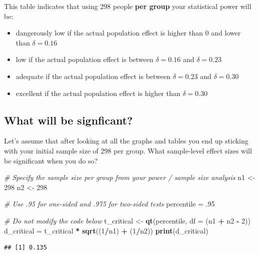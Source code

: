 \documentclass[
]{krantz}
\makeatletter
\newenvironment{Shaded}{\begin{snugshade}}{\end{snugshade}}
\newcommand{\CommentTok}[1]{\textcolor[rgb]{0.37,0.37,0.37}{\textit{#1}}}
\newcommand{\DataTypeTok}[1]{\textcolor[rgb]{0.27,0.27,0.27}{#1}}
\newcommand{\DecValTok}[1]{\textcolor[rgb]{0.06,0.06,0.06}{#1}}
\newcommand{\FloatTok}[1]{\textcolor[rgb]{0.06,0.06,0.06}{#1}}
\newcommand{\KeywordTok}[1]{\textcolor[rgb]{0.27,0.27,0.27}{\textbf{#1}}}
\newcommand{\NormalTok}[1]{#1}
\newcommand{\OperatorTok}[1]{\textcolor[rgb]{0.43,0.43,0.43}{\textbf{#1}}}
\newcommand{\StringTok}[1]{\textcolor[rgb]{0.5,0.5,0.5}{#1}}
\newenvironment{kframe}{%
\medskip{}
\setlength{\fboxsep}{.8em}
 \def\at@end@of@kframe{}%
 \ifinner\ifhmode%
  \def\at@end@of@kframe{\end{minipage}}%
  \begin{minipage}{\columnwidth}%
 \fi\fi%
 \def\FrameCommand##1{\hskip\@totalleftmargin \hskip-\fboxsep
 \colorbox{shadecolor}{##1}\hskip-\fboxsep
     \hskip-\linewidth \hskip-\@totalleftmargin \hskip\columnwidth}%
 \MakeFramed {\advance\hsize-\width
   \@totalleftmargin\z@ \linewidth\hsize
   \@setminipage}}%
 {\par\unskip\endMakeFramed%
 \at@end@of@kframe}
\renewenvironment{Shaded}{\begin{kframe}}{\end{kframe}}
\makeatother
\begin{document}
This table indicates that using 298 people \textbf{per group} your statistical power will be:

\begin{itemize}
\item
  dangerously low if the actual population effect is higher than 0 and lower than \(\delta = 0.16\)
\item
  low if the actual population effect is between \(\delta = 0.16\) and \(\delta = 0.23\)
\item
  adequate if the actual population effect is between \(\delta = 0.23\) and \(\delta = 0.30\)
\item
  excellent if the actual population effect is higher than \(\delta = 0.30\)
\end{itemize}

\hypertarget{what-will-be-signficant}{%
\subsection{What will be signficant?}\label{what-will-be-signficant}}

Let's assume that after looking at all the graphs and tables you end up sticking with your initial sample size of 298 per group. What sample-level effect sizes will be significant when you do so?

\begin{Shaded}
\begin{Highlighting}[]
\CommentTok{# Specify the sample size per group from your power / sample size analysis}
\NormalTok{n1 <-}\StringTok{ }\DecValTok{298}
\NormalTok{n2 <-}\StringTok{ }\DecValTok{298}

\CommentTok{# Use .95 for one-sided and .975 for two-sided tests}
\NormalTok{percentile =}\StringTok{ }\FloatTok{.95} 

\CommentTok{# Do not modify the code below}
\NormalTok{t_critical <-}\StringTok{ }\KeywordTok{qt}\NormalTok{(percentile, }\DataTypeTok{df =}\NormalTok{ (n1 }\OperatorTok{+}\StringTok{ }\NormalTok{n2 }\OperatorTok{-}\StringTok{ }\DecValTok{2}\NormalTok{))}
\NormalTok{d_critical =}\StringTok{ }\NormalTok{t_critical }\OperatorTok{*}\StringTok{ }\KeywordTok{sqrt}\NormalTok{((}\DecValTok{1}\OperatorTok{/}\NormalTok{n1) }\OperatorTok{+}\StringTok{ }\NormalTok{(}\DecValTok{1}\OperatorTok{/}\NormalTok{n2))}
\KeywordTok{print}\NormalTok{(d_critical)}
\end{Highlighting}
\end{Shaded}

\begin{verbatim}
## [1] 0.135
\end{verbatim}
\end{document}
